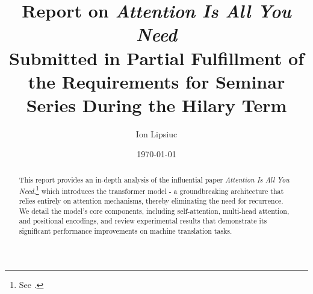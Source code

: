 \documentclass[12pt]{article}
\title{Report on \textit{Attention Is All You Need}\\\vspace{0.5cm}\large Submitted in Partial Fulfillment of the Requirements for Seminar Series During the Hilary Term}
\author{Ion Lipsiuc}
\date{\today}
\begin{document}
\maketitle

\begin{abstract}
  \noindent
  This report provides an in-depth analysis of the influential paper \textit{Attention Is All You Need},\footnote{See \citep{vaswani2017attention}.} which introduces the transformer model - a groundbreaking architecture that relies entirely on attention mechanisms, thereby eliminating the need for recurrence. We detail the model's core components, including self-attention, multi-head attention, and positional encodings, and review experimental results that demonstrate its significant performance improvements on machine translation tasks.
\end{abstract}

\tableofcontents
\newpage










\end{document}
